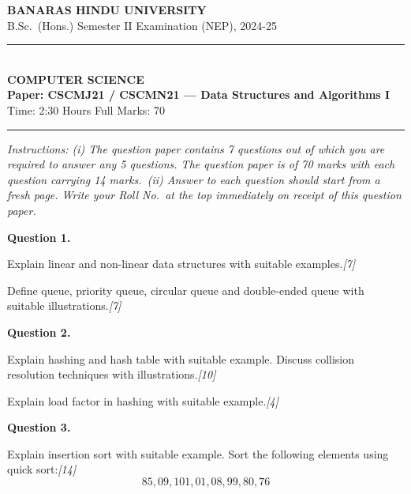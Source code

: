 \documentclass[11pt,a4paper]{article}
\newcommand{\pts}[1]{\hfill   \textit{[#1]}}
\begin{document}
\begin{center}
  {\large\bfseries BANARAS HINDU UNIVERSITY}\\[2pt]
  {\normalsize B.Sc.\ (Hons.) Semester II Examination (NEP), 2024-25}\\[6pt]
  \rule{0.8\linewidth}{0.5pt}\\[6pt]
  {\large\bfseries COMPUTER SCIENCE}\\[4pt]
  {\large\bfseries Paper: CSCMJ21 / CSCMN21 --- Data Structures and Algorithms I}\\[4pt]
  {\normalsize Time: 2:30 Hours \hfill Full Marks: 70}
\end{center}
\rule{\linewidth}{0.4pt}
\smallskip



\noindent   \textit{Instructions: (i) The question paper contains 7 questions out of which you are required to answer any 5 questions. The question paper is of 70 marks with each question carrying 14 marks.\
(ii) Answer to each question should start from a fresh page. Write your Roll No.\ at the top immediately on receipt of this question paper.}
\bigskip




\noindent   \textbf{Question 1.}

\begin{parts}
  \item Explain linear and non-linear data structures with suitable examples.\pts{7}
  \item Define queue, priority queue, circular queue and double-ended queue with suitable illustrations.\pts{7}
\end{parts}

\bigskip



\noindent   \textbf{Question 2.}

\begin{parts}
  \item Explain hashing and hash table with suitable example. Discuss collision resolution techniques with illustrations.\pts{10}
  \item Explain load factor in hashing with suitable example.\pts{4}
\end{parts}

\bigskip



\noindent   \textbf{Question 3.}

\begin{parts}
  \item Explain insertion sort with suitable example. Sort the following elements using quick sort:\pts{14}
  \[85, 09, 101, 01, 08, 99, 80, 76\]
\end{parts}
\end{document}
